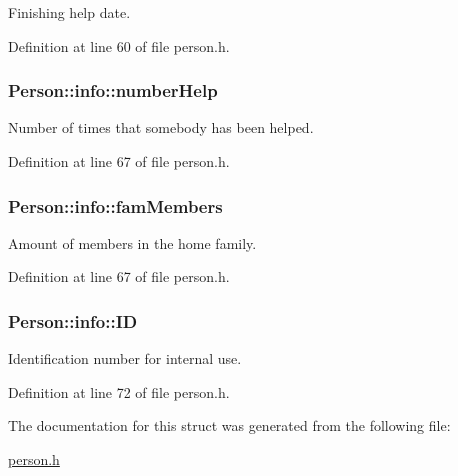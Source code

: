 Finishing help date. 



Definition at line 60 of file person.\+h.

\hypertarget{struct_person_1_1info_a6fd0e334bf6cc9baf667ef94806ed993}{
\subsubsection[{number\+Help}]{\setlength{\rightskip}{0pt plus 5cm}Person\+::info\+::number\+Help}}\label{struct_person_1_1info_a6fd0e334bf6cc9baf667ef94806ed993}


Number of times that somebody has been helped. 



Definition at line 67 of file person.\+h.

\hypertarget{struct_person_1_1info_afc121f83e810c2c0318e115f4ba6d730}{
\subsubsection[{fam\+Members}]{\setlength{\rightskip}{0pt plus 5cm}Person\+::info\+::fam\+Members}}\label{struct_person_1_1info_afc121f83e810c2c0318e115f4ba6d730}


Amount of members in the home family. 



Definition at line 67 of file person.\+h.

\hypertarget{struct_person_1_1info_a535ca27747d371eb58005194190f6bd6}{
\subsubsection[{I\+D}]{\setlength{\rightskip}{0pt plus 5cm}Person\+::info\+::\+I\+D}}\label{struct_person_1_1info_a535ca27747d371eb58005194190f6bd6}


Identification number for internal use. 



Definition at line 72 of file person.\+h.



The documentation for this struct was generated from the following file\+:\begin{DoxyCompactItemize}
\item 
\hyperlink{person_8h}{person.\+h}\end{DoxyCompactItemize}
